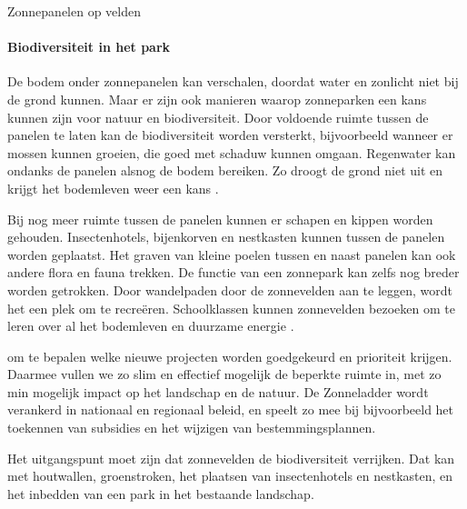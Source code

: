 \begin{voorstel}{Zonnepanelen op velden}
\begin{multicols}{2}
\begin{overwegingen}
\paragraph{Biodiversiteit in het park}
De bodem onder zonnepanelen kan verschalen, doordat water en zonlicht niet bij de grond kunnen. Maar er zijn ook manieren waarop zonneparken een kans kunnen zijn voor natuur en biodiversiteit. Door voldoende ruimte tussen de panelen te laten kan de biodiversiteit worden versterkt, bijvoorbeeld wanneer er mossen kunnen groeien, die goed met schaduw kunnen omgaan. Regenwater kan ondanks de panelen alsnog de bodem bereiken. Zo droogt de grond niet uit en krijgt het bodemleven weer een kans \parencite{van_der_zee_zonneparken_2019}.

Bij nog meer ruimte tussen de panelen kunnen er schapen en kippen worden gehouden. Insectenhotels, bijenkorven en nestkasten kunnen tussen de panelen worden geplaatst. Het graven van kleine poelen tussen en naast panelen kan ook andere flora en fauna trekken. De functie van een zonnepark kan zelfs nog breder worden getrokken. Door wandelpaden door de zonnevelden aan te leggen, wordt het een plek om te recreëren. Schoolklassen kunnen zonnevelden bezoeken om te leren over al het bodemleven en duurzame energie \parencite{bar-organisatie_verkenning_2020}.


\end{overwegingen}

\begin{aanbevelingen}
om te bepalen welke nieuwe projecten worden goedgekeurd en prioriteit krijgen. Daarmee vullen we zo slim en effectief mogelijk de beperkte ruimte in, met zo min mogelijk impact op het landschap en de natuur. De Zonneladder wordt verankerd in nationaal en regionaal beleid, en speelt zo mee bij bijvoorbeeld het toekennen van subsidies en het wijzigen van bestemmingsplannen.

Het uitgangspunt moet zijn dat zonnevelden de biodiversiteit verrijken. Dat kan met houtwallen, groenstroken, het plaatsen van insectenhotels en nestkasten, en het inbedden van een park in het bestaande landschap.


\end{aanbevelingen}
\end{multicols}
\end{voorstel}

